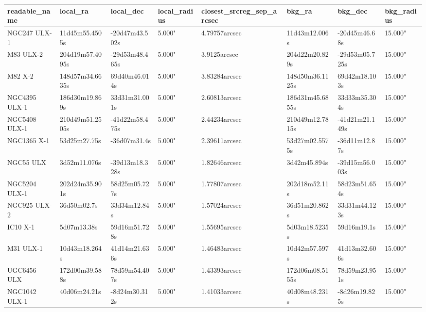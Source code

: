 \begin{tabular}{llllllll}
\toprule
     readable\_name &        local\_ra &      local\_dec & local\_radius & closest\_srcreg\_sep\_arcsec &          bkg\_ra &        bkg\_dec & bkg\_radius \\
\midrule
      NGC247 ULX-1 &  11d45m55.4505s & -20d47m43.502s &       5.000" &             4.79757arcsec &   11d43m12.006s &  -20d45m46.68s &    15.000" \\
         M83 ULX-2 & 204d19m57.4095s & -29d53m48.465s &       5.000" &              3.9125arcsec &  204d22m20.829s & -29d53m05.725s &    15.000" \\
           M82 X-2 & 148d57m34.6635s &  69d40m46.014s &       5.000" &             3.83284arcsec & 148d50m36.1125s &  69d42m18.103s &    15.000" \\
     NGC4395 ULX-1 &  186d30m19.869s &  33d31m31.001s &       5.000" &             2.60813arcsec & 186d31m45.6855s &  33d33m35.304s &    15.000" \\
     NGC5408 ULX-1 & 210d49m51.2505s & -41d22m58.475s &       5.000" &             2.44234arcsec & 210d49m12.7815s & -41d21m21.149s &    15.000" \\
       NGC1365 X-1 &    53d25m27.75s &   -36d07m31.4s &       5.000" &             2.39611arcsec &  53d27m02.5575s &  -36d11m12.87s &    15.000" \\
         NGC55 ULX &    3d52m11.076s & -39d13m18.328s &       5.000" &             1.82646arcsec &    3d42m45.894s & -39d15m56.003s &    15.000" \\
     NGC5204 ULX-1 &  202d24m35.901s &  58d25m05.727s &       5.000" &             1.77807arcsec &   202d18m52.11s &  58d23m51.654s &    15.000" \\
      NGC925 ULX-2 &     36d50m02.7s &   33d34m12.84s &       5.000" &             1.57024arcsec &   36d51m20.862s &  33d31m44.123s &    15.000" \\
          IC10 X-1 &     5d07m13.38s &  59d16m51.728s &       5.000" &             1.55695arcsec &   5d03m18.5235s &    59d16m19.1s &    15.000" \\
         M31 ULX-1 &   10d43m18.264s &  41d14m21.636s &       5.000" &             1.46483arcsec &   10d42m57.597s &  41d13m32.606s &    15.000" \\
       UGC6456 ULX &  172d00m39.588s &  78d59m54.407s &       5.000" &             1.43393arcsec & 172d06m08.5155s &  78d59m23.951s &    15.000" \\
     NGC1042 ULX-1 &    40d06m24.21s &  -8d24m30.312s &       5.000" &             1.41033arcsec &   40d08m48.231s &  -8d26m19.825s &    15.000" \\

\end{tabular}
